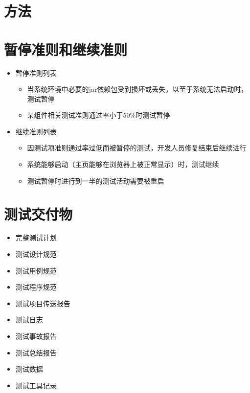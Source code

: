 \documentclass[hyperref, a4paper]{ctexart}
\providecommand{\tightlist}{%
  \setlength{\itemsep}{0pt}\setlength{\parskip}{0pt}}
\begin{document}
\hypertarget{ux65b9ux6cd5}{%
\section{方法}\label{ux65b9ux6cd5}}

\hypertarget{ux6682ux505cux51c6ux5219ux548cux7ee7ux7eedux51c6ux5219}{%
\section{暂停准则和继续准则}\label{ux6682ux505cux51c6ux5219ux548cux7ee7ux7eedux51c6ux5219}}

\begin{itemize}
\tightlist
\item
  暂停准则列表

  \begin{itemize}
  \tightlist
  \item
    当系统环境中必要的jar依赖包受到损坏或丢失，以至于系统无法启动时，测试暂停
  \item
    某组件相关测试准则通过率小于50\%时测试暂停
  \end{itemize}
\item
  继续准则列表

  \begin{itemize}
  \tightlist
  \item
    因测试项准则通过率过低而被暂停的测试，开发人员修复结束后继续进行
  \item
    系统能够启动（主页能够在浏览器上被正常显示）时，测试继续
  \item
    测试暂停时进行到一半的测试活动需要被重启
  \end{itemize}
\end{itemize}

\hypertarget{ux6d4bux8bd5ux4ea4ux4ed8ux7269}{%
\section{测试交付物}\label{ux6d4bux8bd5ux4ea4ux4ed8ux7269}}

\begin{itemize}
\tightlist
\item
  完整测试计划
\item
  测试设计规范
\item
  测试用例规范
\item
  测试程序规范
\item
  测试项目传送报告
\item
  测试日志
\item
  测试事故报告
\item
  测试总结报告
\item
  测试数据
\item
  测试工具记录
\end{itemize}
\end{document}
